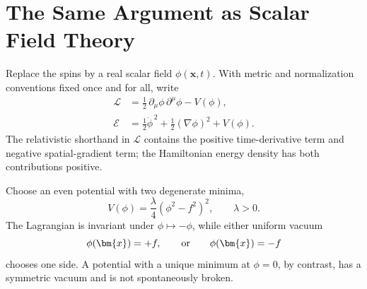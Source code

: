 \begin{classroomqa}
\end{classroomqa}

\section{The Same Argument as Scalar Field Theory}

Replace the spins by a real scalar field \(\phi(\bm{x},t)\). With metric and
normalization conventions fixed once and for all, write
\begin{equation}
\begin{aligned}
  \mathcal L
  &=\frac12\,\partial_\mu\phi\,\partial^\mu\phi-V(\phi),
  \\
  \mathcal E
  &=\frac12\dot\phi^{\,2}+\frac12(\nabla\phi)^2+V(\phi).
\end{aligned}
  \label{eq:l07-real-scalar}
\end{equation}
The relativistic shorthand in \(\mathcal L\) contains the positive
time-derivative term and negative spatial-gradient term; the Hamiltonian
energy density has both contributions positive.

Choose an even potential with two degenerate minima,
\begin{equation}
  V(\phi)=\frac{\lambda}{4}\left(\phi^2-f^2\right)^2,
  \qquad \lambda>0.
  \label{eq:l07-double-well}
\end{equation}
The Lagrangian is invariant under \(\phi\mapsto-\phi\), while either uniform
vacuum
\begin{equation}
  \phi(\bm{x})=+f,
  \qquad\hbox{or}\qquad
  \phi(\bm{x})=-f
\end{equation}
chooses one side. A potential with a unique minimum at \(\phi=0\), by
contrast, has a symmetric vacuum and is not spontaneously broken.

